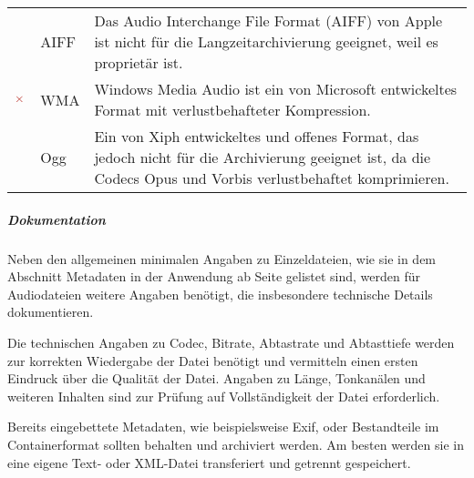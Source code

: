 \begin{center}
\begin{tabular}{l L{0.2\textwidth} p{0.6\textwidth}}
		\cmidrule(r){1-3}
		 & AIFF & Das Audio Interchange File Format (AIFF) von Apple ist nicht für die Langzeitarchivierung geeignet, weil es proprietär ist. \\
			& WMA & Windows Media Audio ist ein von Microsoft entwickeltes Format mit verlustbehafteter Kompression.\\
			& Ogg & Ein von Xiph entwickeltes und offenes Format, das jedoch nicht für die Archivierung geeignet ist, da die Codecs Opus und Vorbis verlustbehaftet komprimieren.\\
 		\bottomrule
		\bottomrule
	\end{tabular}
\end{center}


\subparagraph{Dokumentation} Neben den allgemeinen minimalen Angaben zu Einzeldateien, wie sie in dem Abschnitt Metadaten in der Anwendung ab Seite \pageref{Metadaten-anwendung} gelistet sind, werden für Audiodateien weitere Angaben benötigt, die insbesondere technische Details dokumentieren. 

Die technischen Angaben zu Codec, Bitrate, Abtastrate und Abtasttiefe werden zur korrekten Wiedergabe der Datei benötigt und vermitteln einen ersten Eindruck über die Qualität der Datei. Angaben zu Länge, Tonkanälen und weiteren Inhalten sind zur Prüfung auf Vollständigkeit der Datei erforderlich.

Bereits eingebettete Metadaten, wie beispielsweise Exif, oder Bestandteile im Containerformat sollten behalten und archiviert werden. Am besten werden sie in eine eigene Text- oder XML-Datei transferiert und getrennt gespeichert.

